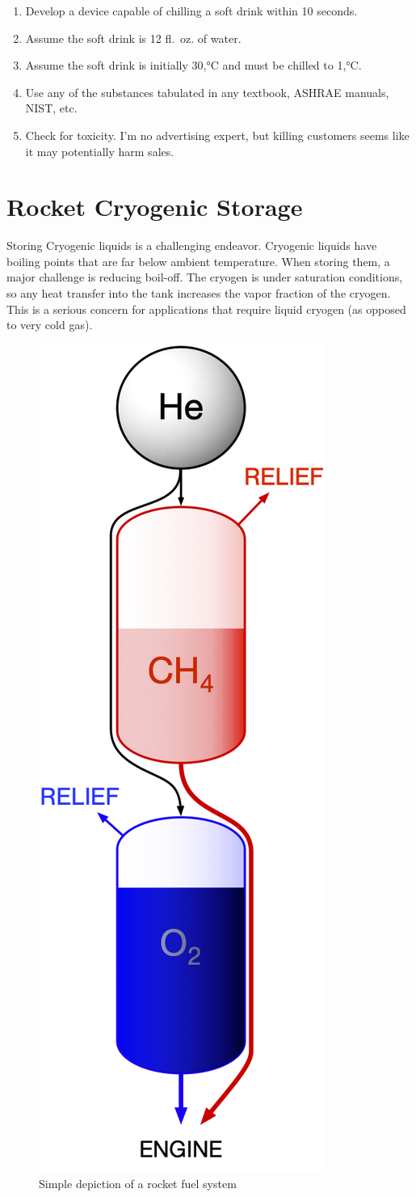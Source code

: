 \documentclass[
]{book}
\providecommand{\tightlist}{%
  \setlength{\itemsep}{0pt}\setlength{\parskip}{0pt}}
\begin{document}
\begin{enumerate}
\def\labelenumi{\arabic{enumi}.}
\tightlist
\item
  Develop a device capable of chilling a soft drink within 10 seconds.
\item
  Assume the soft drink is 12 fl.~oz. of water.\\
\item
  Assume the soft drink is initially 30,°C and must be chilled to 1,°C.
\item
  Use any of the substances tabulated in any textbook, ASHRAE manuals, NIST, etc.
\item
  Check for toxicity. I'm no advertising expert, but killing customers seems like it may potentially harm sales.
\end{enumerate}

\hypertarget{rocket-cryogenic-storage}{%
\chapter{Rocket Cryogenic Storage}\label{rocket-cryogenic-storage}}

Storing Cryogenic liquids is a challenging endeavor.
Cryogenic liquids have boiling points that are far below ambient temperature.
When storing them, a major challenge is reducing boil-off.
The cryogen is under saturation conditions, so any heat transfer into the tank increases the vapor fraction of the cryogen. This is a serious concern for applications that require liquid cryogen (as opposed to very cold gas).

\begin{figure}

{\centering \includegraphics[width=0.25\linewidth]{./figures/rocket-fuel} 

}

\caption{Simple depiction of a rocket fuel system}\label{fig:rocket-fuel}
\end{figure}
\end{document}
